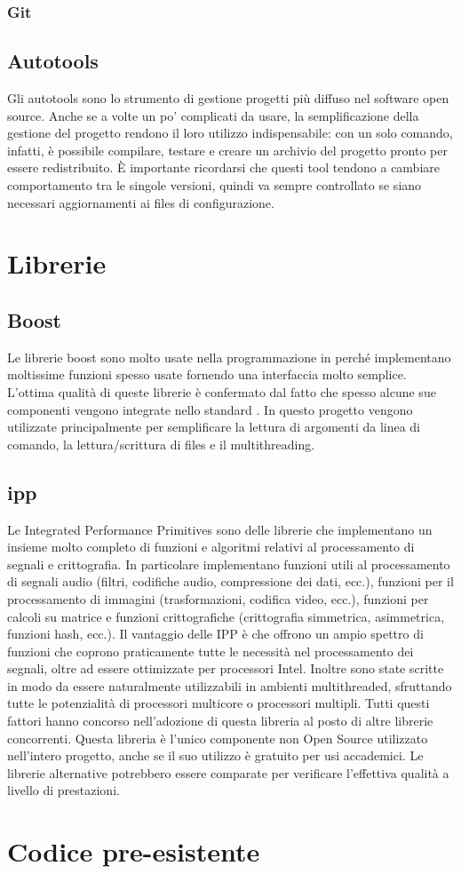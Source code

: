 \subsubsection{Git}

\subsection{Autotools}
Gli autotools sono lo strumento di gestione progetti più diffuso nel software
open source. Anche se a volte un po' complicati da usare, la semplificazione
della gestione del progetto rendono il loro utilizzo indispensabile: con un
solo comando, infatti, \`e possibile compilare, testare e creare un archivio del
progetto pronto per essere redistribuito. \`E importante ricordarsi che questi
tool tendono a cambiare comportamento tra le singole versioni, quindi va sempre
controllato se siano necessari aggiornamenti ai files di configurazione.

\section{Librerie}

\subsection{Boost}
Le librerie boost sono molto usate nella programmazione in \CC perch\'e
implementano moltissime funzioni spesso usate fornendo una interfaccia molto
semplice. L'ottima qualit\`a di queste librerie \`e confermato dal fatto che spesso
alcune sue componenti vengono integrate nello standard \CC. In questo progetto
vengono utilizzate principalmente per semplificare la lettura di argomenti da
linea di comando, la lettura/scrittura di files e il multithreading.

\subsection{\ac{ipp}}
Le Integrated Performance Primitives sono delle librerie che implementano un
insieme molto completo di funzioni e algoritmi relativi al processamento di
segnali e crittografia. In particolare implementano funzioni utili al
processamento di segnali audio (filtri, codifiche audio, compressione dei dati,
ecc.), funzioni per il processamento di immagini (trasformazioni, codifica
video, ecc.), funzioni per calcoli su matrice e funzioni crittografiche
(crittografia simmetrica, asimmetrica, funzioni hash, ecc.).  Il vantaggio
delle IPP \`e che offrono un ampio spettro di funzioni che coprono praticamente
tutte le necessit\`a nel processamento dei segnali, oltre ad essere ottimizzate
per processori Intel. Inoltre sono state scritte in modo da essere naturalmente
utilizzabili in ambienti multithreaded, sfruttando tutte le potenzialit\`a di
processori multicore o processori multipli. Tutti questi fattori hanno concorso
nell'adozione di questa libreria al posto di altre librerie concorrenti. Questa
libreria \`e l'unico componente non Open Source utilizzato nell'intero progetto,
anche se il suo utilizzo \`e gratuito per usi accademici. Le librerie
alternative potrebbero essere comparate per verificare l'effettiva qualit\`a a
livello di prestazioni.

\section{Codice pre-esistente}


